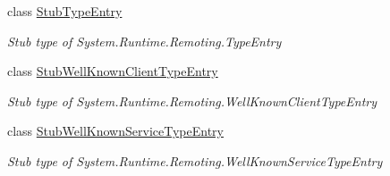 \begin{DoxyCompactItemize}
class \hyperlink{class_system_1_1_runtime_1_1_remoting_1_1_fakes_1_1_stub_type_entry}{Stub\-Type\-Entry}
\begin{DoxyCompactList}\small\item\em Stub type of System.\-Runtime.\-Remoting.\-Type\-Entry\end{DoxyCompactList}\item 
class \hyperlink{class_system_1_1_runtime_1_1_remoting_1_1_fakes_1_1_stub_well_known_client_type_entry}{Stub\-Well\-Known\-Client\-Type\-Entry}
\begin{DoxyCompactList}\small\item\em Stub type of System.\-Runtime.\-Remoting.\-Well\-Known\-Client\-Type\-Entry\end{DoxyCompactList}\item 
class \hyperlink{class_system_1_1_runtime_1_1_remoting_1_1_fakes_1_1_stub_well_known_service_type_entry}{Stub\-Well\-Known\-Service\-Type\-Entry}
\begin{DoxyCompactList}\small\item\em Stub type of System.\-Runtime.\-Remoting.\-Well\-Known\-Service\-Type\-Entry\end{DoxyCompactList}\end{DoxyCompactItemize}
